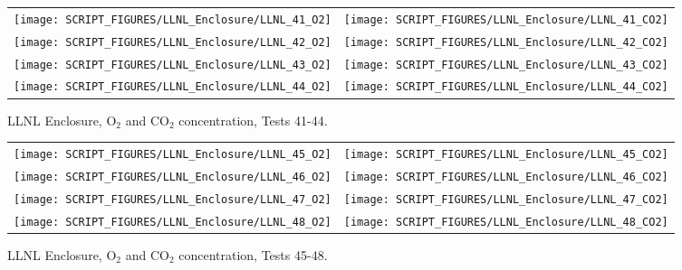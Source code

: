 \begin{figure}[p]
\begin{tabular*}{\textwidth}{l@{\extracolsep{\fill}}r}
\texttt{[image: SCRIPT\_FIGURES/LLNL\_Enclosure/LLNL\_41\_O2]} &
\texttt{[image: SCRIPT\_FIGURES/LLNL\_Enclosure/LLNL\_41\_CO2]} \\
\texttt{[image: SCRIPT\_FIGURES/LLNL\_Enclosure/LLNL\_42\_O2]} &
\texttt{[image: SCRIPT\_FIGURES/LLNL\_Enclosure/LLNL\_42\_CO2]} \\
\texttt{[image: SCRIPT\_FIGURES/LLNL\_Enclosure/LLNL\_43\_O2]} &
\texttt{[image: SCRIPT\_FIGURES/LLNL\_Enclosure/LLNL\_43\_CO2]} \\
\texttt{[image: SCRIPT\_FIGURES/LLNL\_Enclosure/LLNL\_44\_O2]} &
\texttt{[image: SCRIPT\_FIGURES/LLNL\_Enclosure/LLNL\_44\_CO2]}
\end{tabular*}
\caption[LLNL Enclosure, O$_2$ and CO$_2$ concentration, Tests 41-44]{LLNL Enclosure, O$_2$ and CO$_2$ concentration, Tests 41-44.}
\label{LLNL_Gas_11}
\end{figure}

\begin{figure}[p]
\begin{tabular*}{\textwidth}{l@{\extracolsep{\fill}}r}
\texttt{[image: SCRIPT\_FIGURES/LLNL\_Enclosure/LLNL\_45\_O2]} &
\texttt{[image: SCRIPT\_FIGURES/LLNL\_Enclosure/LLNL\_45\_CO2]} \\
\texttt{[image: SCRIPT\_FIGURES/LLNL\_Enclosure/LLNL\_46\_O2]} &
\texttt{[image: SCRIPT\_FIGURES/LLNL\_Enclosure/LLNL\_46\_CO2]} \\
\texttt{[image: SCRIPT\_FIGURES/LLNL\_Enclosure/LLNL\_47\_O2]} &
\texttt{[image: SCRIPT\_FIGURES/LLNL\_Enclosure/LLNL\_47\_CO2]} \\
\texttt{[image: SCRIPT\_FIGURES/LLNL\_Enclosure/LLNL\_48\_O2]} &
\texttt{[image: SCRIPT\_FIGURES/LLNL\_Enclosure/LLNL\_48\_CO2]}
\end{tabular*}
\caption[LLNL Enclosure, O$_2$ and CO$_2$ concentration, Tests 45-48]{LLNL Enclosure, O$_2$ and CO$_2$ concentration, Tests 45-48.}
\label{LLNL_Gas_12}
\end{figure}

